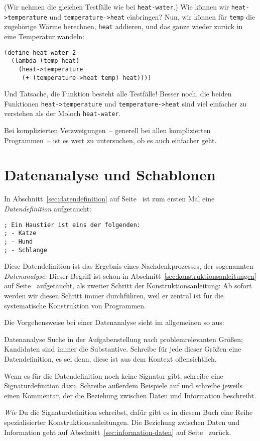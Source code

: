 %
(Wir nehmen die gleichen Testfälle wie bei \lstinline{heat-water}.)
Wie können wir \lstinline{heat->temperature} und
\lstinline{temperature->heat} einbringen?  Nun, wir können für
\lstinline{temp} die zugehörige Wärme berechnen, \lstinline{heat}
addieren, und das ganze wieder zurück in eine Temperatur wandeln:
%
\begin{lstlisting}
(define heat-water-2
  (lambda (temp heat)
    (heat->temperature
     (+ (temperature->heat temp) heat))))
\end{lstlisting}
%
Und Tatsache, die Funktion besteht alle Testfälle!  Besser noch, die
beiden Funktionen \lstinline{heat->temperature} und
\lstinline{temperature->heat} sind viel einfacher zu verstehen als der
Moloch \lstinline{heat-water}.

Bei komplizierten Verzweigungen~-- generell bei allen komplizierten
Programmen~-- ist es wert zu untersuchen, ob es auch einfacher geht.

\section{Datenanalyse und Schablonen}
\label{sec:datenanalyse}

In Abschnitt~\ref{sec:datendefinition} auf
Seite~\pageref{sec:datendefinition} ist zum ersten Mal eine
\textit{Datendefinition} aufgetaucht:
%
\begin{lstlisting}
; Ein Haustier ist eins der folgenden:
; - Katze
; - Hund
; - Schlange
\end{lstlisting}
%
Diese Datendefinition ist das Ergebnis eines Nachdenkprozesses, der
sogenannten \textit{Datenanalyse}.  Dieser Begriff
ist schon in Abschnitt~\ref{sec:konstruktionsanleitungen} auf
Seite~\pageref{sec:konstruktionsanleitungen} aufgetaucht, als zweiter
Schritt der Konstruktionsanleitung: Ab sofort werden wir diesen
Schritt immer durchführen, weil er zentral ist für die systematische
Konstruktion von Programmen.

Die Vorgehensweise bei einer Datenanalyse sieht im allgemeinen so aus:
%
\begin{konstruktionsanleitung}{Datenanalyse}
  Suche in der Aufgabenstellung nach problemrelevanten Größen;
  Kandidaten sind immer die Substantive. Schreibe für jede dieser
  Größen eine Datendefinition, es sei denn, diese ist aus dem Kontext
  offensichtlich.

  Wenn es für die Datendefinition noch keine Signatur gibt, schreibe
  eine Signaturdefinition dazu.  Schreibe außerdem Beispiele auf und
  schreibe jeweils einen Kommentar, der die Beziehung zwischen Daten
  und Information beschreibt.
\end{konstruktionsanleitung}
%
\emph{Wie} Du die Signaturdefinition schreibst, dafür gibt es in
diesem Buch eine Reihe spezialisierter Konstruktionsanleitungen.  Die
Beziehung zwischen Daten und Information geht auf
Abschnitt~\ref{sec:information-daten} auf
Seite~\pageref{sec:information-daten} zurück.


